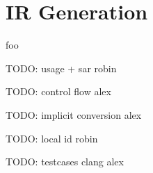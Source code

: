
\section{IR Generation}
\label{sec:ir_generation}

foo

TODO: usage + sar robin

TODO: control flow alex

TODO: implicit conversion alex

TODO: local id robin

TODO: testcases clang alex
